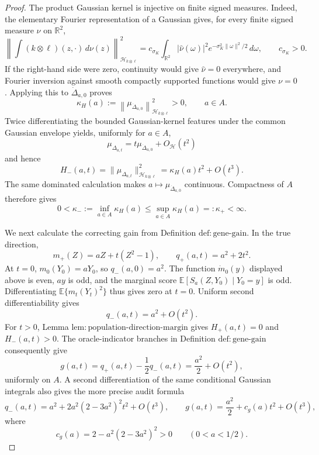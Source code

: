 \documentclass{article}
\begin{document}
\begin{proof}
The product Gaussian kernel is injective on finite signed measures.  Indeed, the elementary Fourier representation of a Gaussian gives, for every finite signed measure \(\nu\) on \(\mathbb R^2\),
\[
\left\|\int (k\otimes\ell)(z,\cdot)\,d\nu(z)\right\|_{\mathcal H_{k\otimes\ell}}^2
=c_{\sigma_K}\int_{\mathbb R^2}|\widehat\nu(\omega)|^2
e^{-\sigma_K^2\|\omega\|^2/2}\,d\omega,\qquad c_{\sigma_K}>0.
\]
If the right-hand side were zero, continuity would give \(\widehat\nu=0\) everywhere, and Fourier inversion against smooth compactly supported functions would give \(\nu=0\).  Applying this to \(\dot\Delta_{a,0}\) proves
\[
\kappa_H(a):=\left\|\mu_{\dot\Delta_{a,0}}\right\|_{\mathcal H_{k\otimes\ell}}^2>0,\qquad a\in A.
\]
Twice differentiating the bounded Gaussian-kernel features under the common Gaussian envelope yields, uniformly for \(a\in A\),
\[
\mu_{\Delta_{a,t}}=t\mu_{\dot\Delta_{a,0}}+O_{\mathcal H}(t^2)
\]
and hence
\[
H_-(a,t)=\|\mu_{\Delta_{a,t}}\|_{\mathcal H_{k\otimes\ell}}^2
=\kappa_H(a)t^2+O(t^3).
\]
The same dominated calculation makes \(a\mapsto\mu_{\dot\Delta_{a,0}}\) continuous.  Compactness of \(A\) therefore gives
\[
0<\kappa_-:=\inf_{a\in A}\kappa_H(a)\le
\sup_{a\in A}\kappa_H(a)=:\kappa_+<\infty.
\]

We next calculate the correcting gain from Definition \(\mathrm{def:gene\text{-}gain}\).  In the true direction,
\[
m_+(Z)=aZ+t(Z^2-1),\qquad q_+(a,t)=a^2+2t^2.
\]
At \(t=0\), \(m_0(Y_0)=aY_0\), so \(q_-(a,0)=a^2\).  The function \(\dot m_0(y)\) displayed above is even, \(a y\) is odd, and the marginal score \(\mathbb E[S_a(Z,Y_0)\mid Y_0=y]\) is odd.  Differentiating \(\mathbb E\{m_t(Y_t)^2\}\) thus gives zero at \(t=0\).  Uniform second differentiability gives
\[
q_-(a,t)=a^2+O(t^2).
\]
For \(t>0\), Lemma \(\mathrm{lem:population\text{-}direction\text{-}margin}\) gives \(H_+(a,t)=0\) and \(H_-(a,t)>0\).  The oracle-indicator branches in Definition \(\mathrm{def:gene\text{-}gain}\) consequently give
\[
g(a,t)=q_+(a,t)-\frac12q_-(a,t)=\frac{a^2}{2}+O(t^2),
\]
uniformly on \(A\).  A second differentiation of the same conditional Gaussian integrals also gives the more precise audit formula
\[
q_-(a,t)=a^2+2a^2(2-3a^2)^2t^2+O(t^3),\qquad
g(a,t)=\frac{a^2}{2}+c_g(a)t^2+O(t^3),
\]
where
\[
c_g(a)=2-a^2(2-3a^2)^2>0\qquad(0<a<1/2).
\]


\end{proof}
\end{document}
